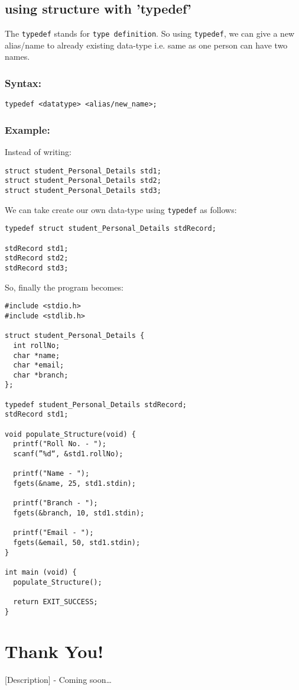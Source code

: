 \documentclass[11pt]{article}
\begin{document}
\subsection{using structure with ’typedef’}
\label{sec:org7c06ca9}

The \texttt{typedef} stands for \texttt{type definition}. So using \texttt{typedef}, we can give a
new alias/name to already existing data-type i.e. same as one person can have
two names.

\subsubsection{Syntax:}
\label{sec:org5021de9}

\begin{verbatim}
typedef <datatype> <alias/new_name>;
\end{verbatim}

\subsubsection{Example:}
\label{sec:org95cad00}

Instead of writing:

\begin{verbatim}
struct student_Personal_Details std1;
struct student_Personal_Details std2;
struct student_Personal_Details std3;
\end{verbatim}

We can take create our own data-type using \texttt{typedef} as follows:

\begin{verbatim}
typedef struct student_Personal_Details stdRecord;

stdRecord std1;
stdRecord std2;
stdRecord std3;
\end{verbatim}

So, finally the program becomes:

\begin{verbatim}
#include <stdio.h>
#include <stdlib.h>

struct student_Personal_Details {
  int rollNo;
  char *name;
  char *email;
  char *branch;
};

typedef student_Personal_Details stdRecord;
stdRecord std1;

void populate_Structure(void) {
  printf("Roll No. - ");
  scanf(”%d“, &std1.rollNo);

  printf("Name - ");
  fgets(&name, 25, std1.stdin);

  printf("Branch - ");
  fgets(&branch, 10, std1.stdin);

  printf("Email - ");
  fgets(&email, 50, std1.stdin);
}

int main (void) {
  populate_Structure();

  return EXIT_SUCCESS;
}
\end{verbatim}

\section{Thank You!}
\label{sec:org671cb5e}

[Description] - Coming soon…
\end{document}
